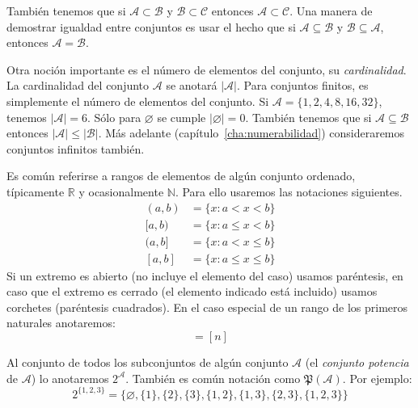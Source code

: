   También tenemos que si \(\mathcal{A} \subset \mathcal{B}\)
  y \(\mathcal{B} \subset \mathcal{C}\)
  entonces \(\mathcal{A} \subset \mathcal{C}\).
  Una manera de demostrar igualdad entre conjuntos%
  es usar el hecho que si \(\mathcal{A} \subseteq \mathcal{B}\)
  y \(\mathcal{B} \subseteq \mathcal{A}\),
  entonces \(\mathcal{A} = \mathcal{B}\).

  Otra noción importante es el número de elementos del conjunto,
  su \emph{cardinalidad}.%
  La cardinalidad del conjunto \(\mathcal{A}\)
  se anotará \(\lvert \mathcal{A} \rvert\).
  Para conjuntos finitos,
  es simplemente el número de elementos del conjunto.
  Si \(\mathcal{A} = \{1, 2, 4, 8, 16, 32\}\),
  tenemos \(\lvert \mathcal{A} \rvert = 6\).
  Sólo para \(\varnothing\)
  se cumple \(\lvert \varnothing \rvert = 0\).
  También tenemos que si \(\mathcal{A} \subseteq \mathcal{B}\)
  entonces
    \(\lvert \mathcal{A} \rvert \le \lvert \mathcal{B} \rvert\)\@.
  Más adelante
  (capítulo~\ref{cha:numerabilidad})
  consideraremos conjuntos infinitos también.

  Es común referirse a rangos de elementos de algún conjunto ordenado,
  típicamente \(\mathbb{R}\) y ocasionalmente \(\mathbb{N}\).%
  Para ello usaremos las notaciones siguientes.
  \begin{align*}
    (a, b)
      &= \{x \colon a < x < b\} \\
    [a, b)
      &= \{x \colon a \le x < b\} \\
    (a, b]
      &= \{x \colon a < x \le b\} \\
    [a, b]
      &= \{x \colon a \le x \le b\}
  \end{align*}
  Si un extremo es abierto
  (no incluye el elemento del caso)
  usamos paréntesis,
  en caso que el extremo es cerrado
  (el elemento indicado está incluido)
  usamos corchetes
  (paréntesis cuadrados).
  En el caso especial de un rango de los primeros naturales
  anotaremos:
  \begin{equation*}
    [1, n] = [n]
  \end{equation*}

  Al conjunto de todos los subconjuntos
  de algún conjunto \(\mathcal{A}\)
  (el \emph{conjunto potencia} de \(\mathcal{A}\))%
  lo anotaremos \(2^{\mathcal{A}}\).
  También es común notación como \(\mathfrak{P}(\mathcal{A})\).
  Por ejemplo:
  \begin{equation*}
    2^{\{1, 2, 3\}}
      = \{\varnothing,
	  \{1\}, \{2\}, \{3\},
	  \{1, 2\}, \{1, 3\}, \{2, 3\},
	  \{1, 2, 3\}\}
  \end{equation*}

